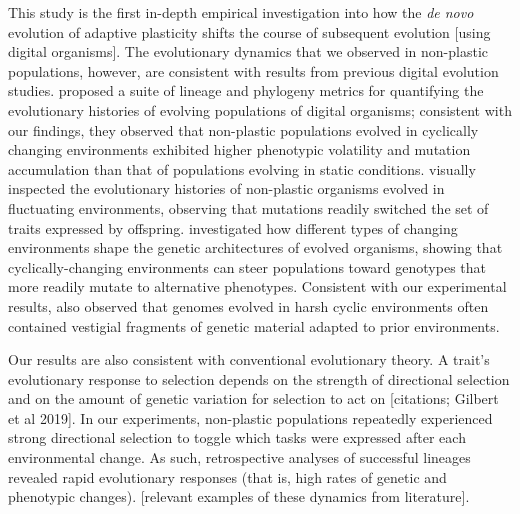 This study is the first in-depth empirical investigation into how the \textit{de novo} evolution of adaptive plasticity shifts the course of subsequent evolution [using digital organisms].
The evolutionary dynamics that we observed in non-plastic populations, however, are consistent with results from previous digital evolution studies. %
\cite{dolson_interpreting_2020} proposed a suite of lineage and phylogeny metrics for quantifying the evolutionary histories of evolving populations of digital organisms; consistent with our findings, they observed that non-plastic populations evolved in cyclically changing environments exhibited higher phenotypic volatility and mutation accumulation than that of populations evolving in static conditions.
\cite{lalejini_evolutionary_2016} visually inspected the evolutionary histories of non-plastic organisms evolved in fluctuating environments, observing that mutations readily switched the set of traits expressed by offspring.
\cite{canino-koning_evolution_2016} investigated how different types of changing environments shape the genetic architectures of evolved organisms, showing that cyclically-changing environments can steer populations toward genotypes that more readily mutate to alternative phenotypes.
Consistent with our experimental results, \cite{canino-koning_evolution_2016} also observed that genomes evolved in harsh cyclic environments often contained vestigial fragments of genetic material adapted to prior environments.


Our results are also consistent with conventional evolutionary theory.
A trait's evolutionary response to selection depends on the strength of directional selection and on the amount of genetic variation for selection to act on [citations; Gilbert et al 2019].
In our experiments, non-plastic populations repeatedly experienced strong directional selection to toggle which tasks were expressed after each environmental change.
As such, retrospective analyses of successful lineages revealed rapid evolutionary responses (that is, high rates of genetic and phenotypic changes).
[relevant examples of these dynamics from literature].

